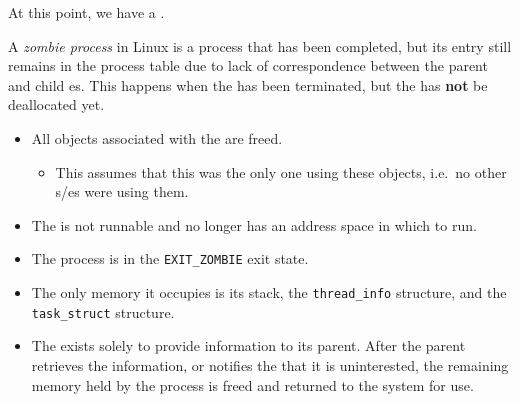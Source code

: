 At this point, we have a .

\begin{definition}\label{def:Zombie_Process}
  A \emph{zombie process} in Linux is a process that has been completed, but its entry still remains in the process table due to lack of correspondence between the parent and child es.
  This happens when the  has been terminated, but the  has \textbf{not} be deallocated yet.

  \begin{itemize}[noitemsep]
  \item All objects associated with the  are freed.
    \begin{itemize}[noitemsep]
    \item This assumes that this  was the only one using these objects, i.e.\ no other s/es were using them.
    \end{itemize}
  \item The  is not runnable and no longer has an address space in which to run.
  \item The process is in the \texttt{EXIT_ZOMBIE} exit state.
  \item The only memory it occupies is its  stack, the \texttt{thread_info} structure, and the \texttt{task_struct} structure.
  \item The  exists solely to provide information to its parent.
    After the parent retrieves the information, or notifies the  that it is uninterested, the remaining memory held by the process is freed and returned to the system for use.
  \end{itemize}
\end{definition}


